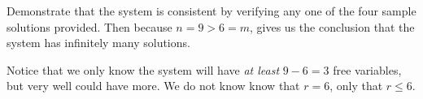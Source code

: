Demonstrate that the system is consistent by verifying any one of the four sample solutions provided.  Then because $n=9>6=m$,  gives us the conclusion that the system has infinitely many solutions.\par
%
Notice that we only know the system will have {\em at least} $9-6=3$ free variables, but very well could have more.  We do not know know that $r=6$, only that $r\leq 6$.